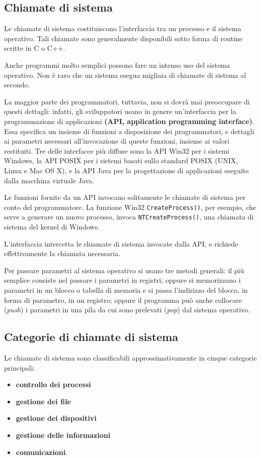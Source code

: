 \documentclass[11pt,a4paper]{article}
\begin{document}
\subsection{Chiamate di sistema}
Le chiamate di sistema costituiscono l'interfaccia tra un processo e il sistema operativo. Ta­li chiamate sono generalmente disponibili sotto forma di routine scritte in C o C++.

Anche programmi molto semplici possono fare un intenso uso del sistema operativo. Non è raro che un sistema ese­gua migliaia di chiamate di sistema al secondo.

La maggior parte dei programmatori, tuttavia, non si dovrà mai preoccupare di questi
dettagli: infatti, gli sviluppatori usano in genere un'interfaccia per la programmazione di
applicazioni \textbf{(API, application programming interface)}. Essa specifica un insieme di funzioni a
disposizione dei programmatori, e dettagli ai parametri necessari all'invocazione di queste
funzioni, insieme ai valori restituiti. Tre delle interfacce più diffuse sono la API Win32 per i
sistemi Windows, la API POSIX per i sistemi basati sullo standard POSIX (UNIX, Linux e Mac OS X), e la API Java per la progettazione di applicazioni eseguite dalla macchina virtuale Java.

Le funzioni fornite da un API invocano solitamente le chiamate di si­stema per conto del programmatore. La funzione Win32 \texttt{CreateProcess()}, per esem­pio, che serve a generare un nuovo processo, invoca  \texttt{NTCreateProcess()}, una chiamata di sistema del kernel di Windows.

L'interfaccia in­tercetta le chiamate di sistema invocate dalla API, e richiede effettivamente la chiamata ne­cessaria.\medskip

Per passare parametri al sistema operativo si usano tre metodi generali: il più semplice consiste nel passare i parametri in registri; oppure si memorizzano i parametri in un blocco
o tabella di memoria e si passa l'indirizzo del blocco, in forma di parametro, in un registro; oppure il programma può anche col­locare (\emph{push}) i parametri in una pila da cui sono prelevati (\emph{pop}) dal sistema operativo.

\subsection{Categorie di chiamate di sistema}
Le chiamate di sistema sono classificabili approssimativamente in cinque categorie principa­li:
\begin{itemize}[noitemsep]
  \item \textbf{controllo dei processi}
  \item \textbf{gestione dei file}
  \item \textbf{gestione dei dispositivi}
  \item \textbf{gestione delle informa­zioni}
  \item \textbf{comunicazioni}.
\end{itemize}
\end{document}
